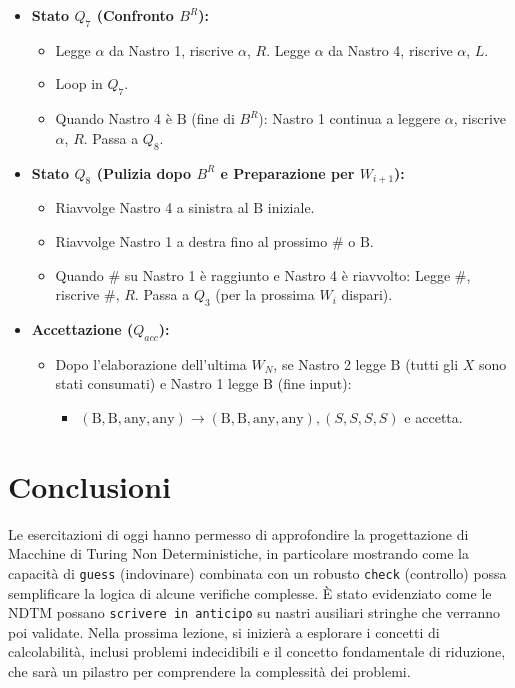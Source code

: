 \documentclass[a4paper, 11pt]{book} %
\theoremstyle{definition}
\newcommand{\B}{\text{B}} %
\begin{document}
\begin{itemize}
\begin{itemize}
        \end{itemize}
    \item \textbf{Stato $Q_7$ (Confronto $B^R$):}
        \begin{itemize}
            \item Legge $\alpha$ da Nastro 1, riscrive $\alpha$, $R$. Legge $\alpha$ da Nastro 4, riscrive $\alpha$, $L$.
            \item Loop in $Q_7$.
            \item Quando Nastro 4 è $\B$ (fine di $B^R$): Nastro 1 continua a leggere $\alpha$, riscrive $\alpha$, $R$. Passa a $Q_8$.
        \end{itemize}
    \item \textbf{Stato $Q_8$ (Pulizia dopo $B^R$ e Preparazione per $W_{i+1}$):}
        \begin{itemize}
            \item Riavvolge Nastro 4 a sinistra al $\B$ iniziale.
            \item Riavvolge Nastro 1 a destra fino al prossimo $\#$ o $\B$.
            \item Quando $\#$ su Nastro 1 è raggiunto e Nastro 4 è riavvolto: Legge $\#$, riscrive $\#$, $R$. Passa a $Q_3$ (per la prossima $W_i$ dispari).
        \end{itemize}
    \item \textbf{Accettazione ($Q_{acc}$):}
        \begin{itemize}
            \item Dopo l'elaborazione dell'ultima $W_N$, se Nastro 2 legge $\B$ (tutti gli $X$ sono stati consumati) e Nastro 1 legge $\B$ (fine input):
                \begin{itemize}
                    \item $(\B, \B, \text{any}, \text{any}) \to (\B, \B, \text{any}, \text{any}), (S,S,S,S)$ e accetta.
                \end{itemize}
        \end{itemize}
\end{itemize}

\section{Conclusioni}
Le esercitazioni di oggi hanno permesso di approfondire la progettazione di Macchine di Turing Non Deterministiche, in particolare mostrando come la capacità di \texttt{guess} (indovinare) combinata con un robusto \texttt{check} (controllo) possa semplificare la logica di alcune verifiche complesse. È stato evidenziato come le NDTM possano \texttt{scrivere in anticipo} su nastri ausiliari stringhe che verranno poi validate.
Nella prossima lezione, si inizierà a esplorare i concetti di calcolabilità, inclusi problemi indecidibili e il concetto fondamentale di riduzione, che sarà un pilastro per comprendere la complessità dei problemi.
\end{document}
